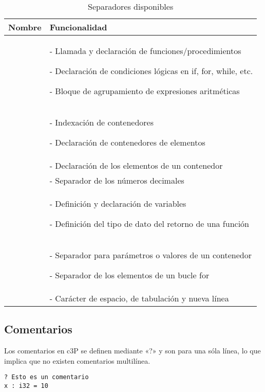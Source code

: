 \begin{table}[H]
    \centering
    \begin{tabular}{|c|p{10cm}|}
         \hline
         \textbf{Nombre} & \textbf{Funcionalidad}  \\
         \hline
         \multirow{3}{*}{\centering{( )}} &
         - Llamada y declaración de funciones/procedimientos \par
         - Declaración de condiciones lógicas en if, for, while, etc. \par
         - Bloque de agrupamiento de expresiones aritméticas \\
         \hline
         \multirow{2}{*}{\centering{[ ]}} &
         - Indexación de contenedores \par
         - Declaración de contenedores de elementos \\
         \hline
         \multirow{1}{*}{\centering{\{ \}}} &
         - Declaración de los elementos de un contenedor \\
         \hline
         \multirow{1}{*}{\centering{.}} &
         - Separador de los números decimales \\
         \hline
         \multirow{2}{*}{\centering{:}} &
         - Definición y declaración de variables \par
	 - Definición del tipo de dato del retorno de una función \\
         \hline
         \multirow{1}{*}{\centering{,}} &
         - Separador para parámetros o valores de un contenedor \par
	 - Separador de los elementos de un bucle for \\
         \hline
         \multirow{1}{*}{\centering{SPACE}} &
         - Carácter de espacio, de tabulación y nueva línea \\
         \hline
    \end{tabular}
    \caption{Separadores disponibles}
    \label{tab:tab_separadores_disponibles}
\end{table}

\subsection{Comentarios}

Los comentarios en c3P se definen mediante «?» y son
para una sóla línea, lo que implica que no existen
comentarios multilínea.

\begin{verbatim}
? Esto es un comentario
x : i32 = 10
\end{verbatim}
